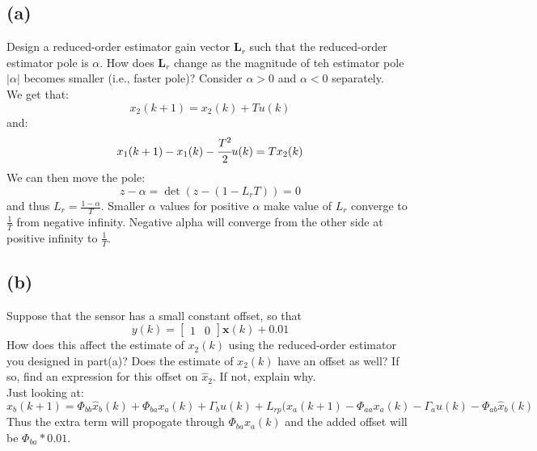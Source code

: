 \documentclass{article}
\begin{document}
\subsection*{(a)}
Design a reduced-order estimator gain vector $\pmb{L}_r$ such that the reduced-order estimator pole is $\alpha$. How does $\pmb{L}_r$ change as the magnitude of teh estimator pole $\lvert\alpha\rvert$ becomes smaller (i.e., faster pole)? Consider $\alpha >0$ and $\alpha <0$ separately.\\
We get that:
\[x_2(k+1)=x_2(k)+Tu(k)\]
and:
\[x_1(k+1)-x_1(k)-\cfrac{T^2}{2}u(k)=Tx_2(k)\]
We can then move the pole:
\[z-\alpha=\det(z-(1-L_rT))=0\]
and thus $L_r=\frac{1-\alpha}{T}$. Smaller $\alpha$ values for positive $\alpha$ make value of $L_r$ converge to $\frac{1}{T}$ from negative infinity. Negative alpha will converge from the other side at positive infinity to $\frac{1}{T}$.
\subsection*{(b)}
Suppose that the sensor has a small constant offset, so that
\[y(k)=\begin{bmatrix}1&0\end{bmatrix}\pmb{x}(k)+0.01\]
How does this affect the estimate of $x_2(k)$ using the reduced-order estimator you designed in part(a)? Does the estimate of $x_2(k)$ have an offset as well? If so, find an expression for this offset on $\hat{x}_2$. If not, explain why.\\
Just looking at:
\[\hat{x}_b(k+1)=\Phi_{bb}\hat{x}_b(k)+\Phi_{ba}x_a(k)+\Gamma_bu(k)+L_{rp}(x_a(k+1)-\Phi_{aa}x_a(k)-\Gamma_au(k)-\Phi_{ab}\hat{x}_b(k)\]
Thus the extra term will propogate through $\Phi_{ba}x_a(k)$ and the added offset will be $\Phi_{ba}*0.01$.
\end{document}
